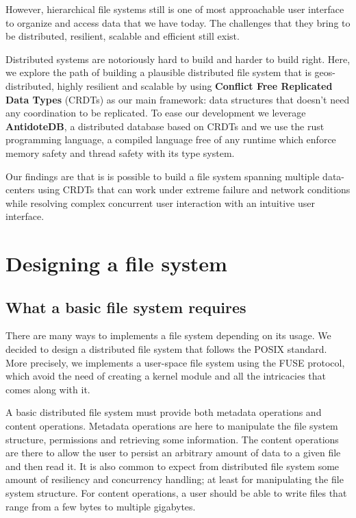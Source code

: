 \documentclass[sigplan, 10pt]{acmart}
\begin{document}
However, hierarchical file systems still is one of most approachable
user interface to organize and access data that we have today.
The challenges that they bring to be distributed, resilient, scalable
and efficient still exist.

Distributed systems are notoriously hard to build and harder to
build right. Here, we explore the path of building a plausible distributed file
system that is geos-distributed, highly resilient and scalable by using
\textbf{Conflict Free Replicated Data Types} (CRDTs) as our main framework:
data structures that doesn't need any coordination to be replicated. To ease our
development we leverage \textbf{AntidoteDB}, a distributed database based
on CRDTs and we use the rust programming language,
a compiled language free of any runtime which enforce memory safety and
thread safety with its type system.

Our findings are that is is possible to build a file system spanning multiple
data-centers using CRDTs that can work under extreme failure and network conditions while
resolving complex concurrent user interaction with an intuitive user interface.

\section{Designing a file system}

\subsection{What a basic file system requires}

There are many ways to implements a file system depending on its usage. We
decided to design a distributed file system that follows  the POSIX standard.
More precisely, we implements a user-space file system using the FUSE protocol,
which avoid the need of creating a kernel module and all the intricacies
that comes along with it.

A basic distributed file system must provide both metadata operations and
content operations. Metadata operations are here to manipulate the file system
structure, permissions and retrieving some information. The content operations
are there to allow the user to persist an arbitrary amount of data to a given
file and then read it.
It is also common to expect from distributed file system some amount
of resiliency and concurrency handling; at least for manipulating the
file system structure. For content operations,
a user should be able to write files that range from
a few bytes to multiple gigabytes.
\end{document}
